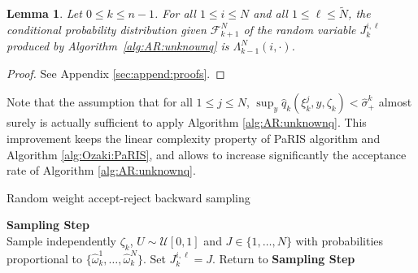 \documentclass[12pt,draft]{article}
\newcommand{\eqsp}{\;}
\newcommand{\1}{\mathrm{1}}
\newcommand{\qk}{q_{k}}
\newtheorem{lemma}{Lemma}
\begin{document}
\begin{lemma}
\label{lem:AR:unbiased}
Let $0\le k\le n-1$.  For all $1\le i \le N$ and all $1\le \ell \le \widetilde{N}$, the conditional probability distribution given $\mathcal{F}_{k+1}^N$ of the random variable $J_{k}^{i,\ell}$ produced by Algorithm~\ref{alg:AR:unknownq} is  $\Lambda_{k-1}^N(i,\cdot)$. 
\end{lemma}
\begin{proof}
See Appendix \ref{sec:append:proofs}.
\end{proof}
Note that the assumption that for all $1\le j\le N$, $\sup_y \hat{q}_k(\xi_k^j,y,\zeta_k)< \hat{\sigma}_+^k$ almost surely is actually sufficient to apply Algorithm \ref{alg:AR:unknownq}. This improvement keeps the linear complexity property of PaRIS algorithm and Algorithm \ref{alg:Ozaki:PaRIS}, and allows to increase significantly the acceptance rate of Algorithm \ref{alg:AR:unknownq}. %
\begin{algorithm}[H]
\caption{Random weight accept-reject backward sampling}
\begin{algorithmic}
\STATE \textbf{\sc Sampling Step} \\
Sample independently $
\zeta_k$, $U\sim \mathcal{U}[0,1]$ and $J\in\{1,\ldots,N\}$ with probabilities proportional to $\{\widehat{\omega}_{k}^1,\dots,\widehat{\omega}_{k}^N\}$.
\IF{ $$U \leq \frac{\widehat{\qk}(\xi_{k}^J,\xi_{k+1}^i,\zeta_k)}{\hat{\sigma}_+},$$}
\STATE Set $J_k^{i,\ell} = J$.
\ELSE 
\STATE Return to \textbf{\sc Sampling Step}
\ENDIF
\ENDFOR
\ENDFOR
\end{algorithmic}
\label{alg:AR:unknownq}
\end{algorithm}
\end{document}
